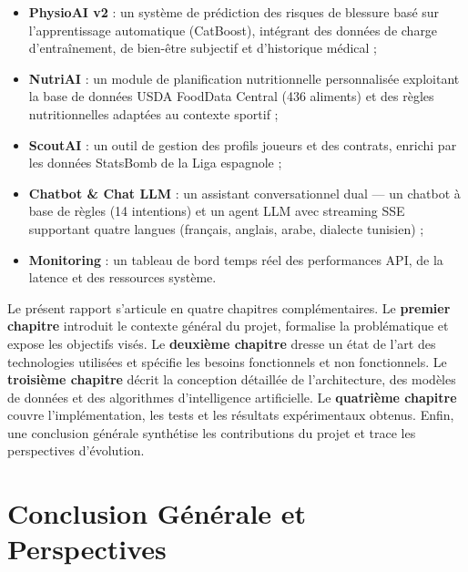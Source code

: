 \documentclass{modificopy}
\begin{document}
\begin{itemize}
    \item \textbf{PhysioAI v2} : un système de prédiction des risques de blessure basé sur l'apprentissage automatique (CatBoost), intégrant des données de charge d'entraînement, de bien-être subjectif et d'historique médical ;
    \item \textbf{NutriAI} : un module de planification nutritionnelle personnalisée exploitant la base de données USDA FoodData Central (436 aliments) et des règles nutritionnelles adaptées au contexte sportif ;
    \item \textbf{ScoutAI} : un outil de gestion des profils joueurs et des contrats, enrichi par les données StatsBomb de la Liga espagnole ;
    \item \textbf{Chatbot \& Chat LLM} : un assistant conversationnel dual — un chatbot à base de règles (14 intentions) et un agent LLM avec streaming SSE supportant quatre langues (français, anglais, arabe, dialecte tunisien) ;
    \item \textbf{Monitoring} : un tableau de bord temps réel des performances API, de la latence et des ressources système.
\end{itemize}

Le présent rapport s'articule en quatre chapitres complémentaires. Le \textbf{premier chapitre} introduit le contexte général du projet, formalise la problématique et expose les objectifs visés. Le \textbf{deuxième chapitre} dresse un état de l'art des technologies utilisées et spécifie les besoins fonctionnels et non fonctionnels. Le \textbf{troisième chapitre} décrit la conception détaillée de l'architecture, des modèles de données et des algorithmes d'intelligence artificielle. Le \textbf{quatrième chapitre} couvre l'implémentation, les tests et les résultats expérimentaux obtenus. Enfin, une conclusion générale synthétise les contributions du projet et trace les perspectives d'évolution.

\newpage
\tableofcontents






\newpage
\chapter*{Conclusion Générale et Perspectives}
\end{document}
